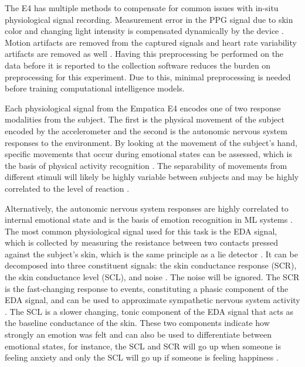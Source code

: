\documentclass[12pt]{iopart}
\begin{document}
The E4 has multiple methods to compensate for common issues with in-situ physiological signal recording.  Measurement error in the PPG signal due to skin color and changing light intensity is compensated dynamically by the device \cite{goodwin2019predicting}.  Motion artifacts are removed from the captured signals and heart rate variability artifacts are removed as well 
\cite{goodwin2019predicting}.  Having this preprocessing be performed on the data before it is reported to the collection software reduces the burden on preprocessing for this experiment.  Due to this, minimal preprocessing is needed before training computational intelligence models.

Each physiological signal from the Empatica E4 encodes one of two response modalities from the subject.  The first is the physical movement of the subject encoded by the accelerometer and the second is the autonomic nervous system responses to the environment.  By looking at the movement of the subject’s hand, specific movements that occur during emotional states can be assessed, which is the basis of physical activity recognition \cite{ravi2005activity}.  The separability of movements from different stimuli will likely be highly variable between subjects and may be highly correlated to the level of reaction \cite{thang2012gait}.

Alternatively, the autonomic nervous system responses are highly correlated to internal emotional state \cite{kreibig2010autonomic} and is the basis of emotion recognition in ML systems \cite{healey2005detecting}.  The most common physiological signal used for this task is the EDA signal, which is collected by measuring the resistance between two contacts pressed against the subject’s skin, which is the same principle as a lie detector \cite{society2012publication, arce2021biosensor}.  It can be decomposed into three constituent signals: the skin conductance response (SCR), the skin conductance level (SCL), and noise \cite{greco2015cvxeda}.  The noise will be ignored.  The SCR is the fast-changing response to events, constituting a phasic component of the EDA signal, and can be used to approximate sympathetic nervous system activity \cite{society2012publication, benedek2010continuous}.  The SCL is a slower changing, tonic component of the EDA signal that acts as the baseline conductance of the skin.  These two components indicate how strongly an emotion was felt and can also be used to differentiate between emotional states, for instance, the SCL and SCR will go up when someone is feeling anxiety and only the SCL will go up if someone is feeling happiness \cite{kreibig2010autonomic}.  
\end{document}
